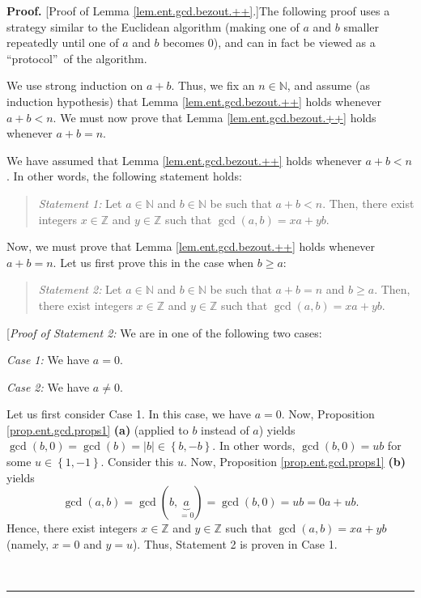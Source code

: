 \documentclass[numbers=enddot,12pt,final,onecolumn,notitlepage]{scrartcl}%
\numberwithin{exer}{subsection}
\theoremstyle{definition}
\newenvironment{statement}{\begin{quote}}{\end{quote}}
\newenvironment{proof}[1][Proof]{\noindent\textbf{#1.} }{\ \rule{0.5em}{0.5em}}
\begin{document}
\begin{proof}
[Proof of Lemma \ref{lem.ent.gcd.bezout.++}.]The following proof uses a
strategy similar to the Euclidean algorithm (making one of $a$ and $b$ smaller
repeatedly until one of $a$ and $b$ becomes $0$), and can in fact be viewed as
a \textquotedblleft protocol\textquotedblright\ of the algorithm.

We use strong induction on $a+b$. Thus, we fix an $n\in\mathbb{N}$, and assume
(as induction hypothesis) that Lemma \ref{lem.ent.gcd.bezout.++} holds
whenever $a+b<n$. We must now prove that Lemma \ref{lem.ent.gcd.bezout.++}
holds whenever $a+b=n$.

We have assumed that Lemma \ref{lem.ent.gcd.bezout.++} holds whenever $a+b<n$.
In other words, the following statement holds:

\begin{statement}
\textit{Statement 1:} Let $a\in\mathbb{N}$ and $b\in\mathbb{N}$ be such that
$a+b<n$. Then, there exist integers $x\in\mathbb{Z}$ and $y\in\mathbb{Z}$ such
that $\gcd\left(  a,b\right)  =xa+yb$.
\end{statement}

Now, we must prove that Lemma \ref{lem.ent.gcd.bezout.++} holds whenever
$a+b=n$. Let us first prove this in the case when $b\geq a$:

\begin{statement}
\textit{Statement 2:} Let $a\in\mathbb{N}$ and $b\in\mathbb{N}$ be such that
$a+b=n$ and $b\geq a$. Then, there exist integers $x\in\mathbb{Z}$ and
$y\in\mathbb{Z}$ such that $\gcd\left(  a,b\right)  =xa+yb$.
\end{statement}

[\textit{Proof of Statement 2:} We are in one of the following two cases:

\textit{Case 1:} We have $a=0$.

\textit{Case 2:} We have $a\neq0$.

Let us first consider Case 1. In this case, we have $a=0$. Now, Proposition
\ref{prop.ent.gcd.props1} \textbf{(a)} (applied to $b$ instead of $a$) yields
$\gcd\left(  b,0\right)  =\gcd\left(  b\right)  =\left\vert b\right\vert
\in\left\{  b,-b\right\}  $. In other words, $\gcd\left(  b,0\right)  =ub$ for
some $u\in\left\{  1,-1\right\}  $. Consider this $u$. Now, Proposition
\ref{prop.ent.gcd.props1} \textbf{(b)} yields%
\[
\gcd\left(  a,b\right)  =\gcd\left(  b,\underbrace{a}_{=0}\right)
=\gcd\left(  b,0\right)  =ub=0a+ub.
\]
Hence, there exist integers $x\in\mathbb{Z}$ and $y\in\mathbb{Z}$ such that
$\gcd\left(  a,b\right)  =xa+yb$ (namely, $x=0$ and $y=u$). Thus, Statement 2
is proven in Case 1.


\end{proof}
\end{document}
